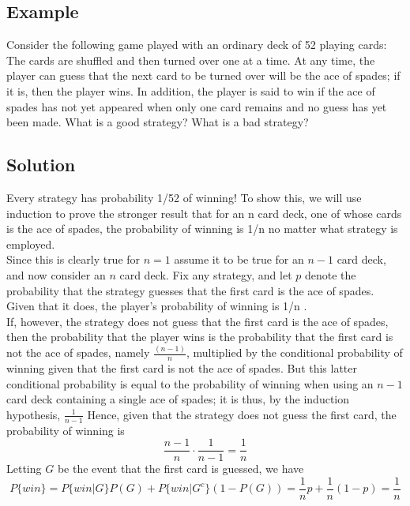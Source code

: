\subsection*{Example}
Consider the following game played with an ordinary deck of 52 playing cards:
The cards are shuffled and then turned over one at a time. At any time, the
player can guess that the next card to be turned over will be the ace of spades; if
it is, then the player wins. In addition, the player is said to win if the ace of
spades has not yet appeared when only one card remains and no guess has yet
been made. What is a good strategy? What is a bad strategy?
\subsection*{Solution}
Every strategy has probability 1/52 of winning! To show this, we will use induction to prove the stronger result that for an n card deck, one of whose cards is the ace of spades, the probability of winning is 1/n no matter what strategy is employed.\\ Since this is clearly true for $n=1$ assume it to be true for an $n-1$ card deck, and now consider an $n$ card deck. Fix any strategy, and let $p$ denote the probability that the strategy guesses that the first card is the ace of spades. Given that it does, the player’s probability of winning is 1/n . \\If, however, the
strategy does not guess that the first card is the ace of spades, then the
probability that the player wins is the probability that the first card is not the ace
of spades, namely $\frac{(n-1)}{n}$, multiplied by the conditional probability of winning
given that the first card is not the ace of spades. But this latter conditional
probability is equal to the probability of winning when using an $n-1$ card deck
containing a single ace of spades; it is thus, by the induction hypothesis, $\frac{1}{n-1}$
Hence, given that the strategy does not guess the first card, the
probability of winning is \[\frac{n-1}{n}\cdot\frac{1}{n-1} = \frac{1}{n}\]
Letting $G$ be the event that the first card is guessed, we have
\[P\{win\} = P\{win | G\}P(G) + P\{win|G^c\}(1-P(G)) = \frac{1}{n}p + \frac{1}{n}(1-p) = \frac{1}{n}\]
